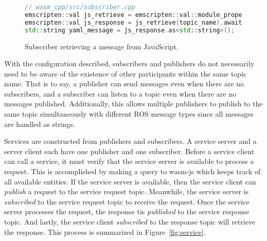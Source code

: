     \begin{figure}[htbp]
        \centering
        \begin{lstlisting}[language=C++]
// wasm_cpp/src/subscriber.cpp
emscripten::val js_retrieve = emscripten::val::module_property("retrieveMessage");
emscripten::val js_response = js_retrieve(topic_name).await();
std::string yaml_message = js_response.as<std::string>();
\end{lstlisting}    
        \caption{Subscriber retrieving a message from JavaScript.}
        \label{fig:retrieve}
    \end{figure}

    With the configuration described, subscribers and publishers do not necessarily need to be aware of the existence of other participants within the same topic name. That is to say, a publisher can send messages even when there are no subscribers, and a subscriber can listen to a topic even when there are no messages published. Additionally, this allows multiple publishers to publish to the same topic simultaneously with different \ac{ROS} message types since all messages are handled as strings.

    Services are constructed from publishers and subscribers. A service server and a server client each have one publisher and one subscriber. Before a service client can call a service, it must verify that the service server is available to process a request. This is accomplished by making a query to \textsf{wasm-js} which keeps track of all available entities. If the service server is available, then the service client can \textit{publish} a request to the service request topic. Meanwhile, the service server is \textit{subscribed} to the service request topic to receive the request. Once the service server processes the request, the response tis \textit{published} to the service response topic. And lastly, the service client \textit{subscribed} to the response topic will retrieve the response. This process is summarized in Figure~\ref{fig:service}.

